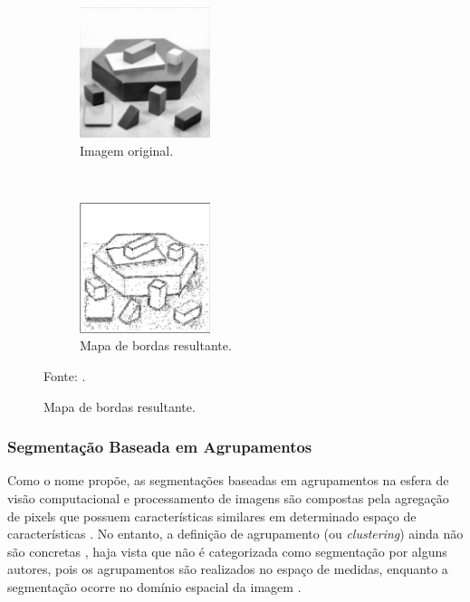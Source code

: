 \begin{figure}[H]
   \caption{Segmentação com operador Laplaciano.}
   \centering
   \label{segment:fig:8}
    \begin{subfigure}[t]{0.45\textwidth}
        \centering
        \includegraphics[height=1.5in]{recursos/imagens/image_seg/ol1.png}
        \caption{Imagem original.}
        \label{segment:fig:8.1}
    \end{subfigure}%
    ~ 
    \begin{subfigure}[t]{0.45\textwidth}
        \centering
        \includegraphics[height=1.5in]{recursos/imagens/image_seg/lp2.png}
        \caption{Mapa de bordas resultante.}
        \label{segment:fig:8.2}
    \end{subfigure}%

    \vspace*{1 cm}
    Fonte: \cite{pedrini2008analise}.
\end{figure}

\subsubsection{Segmentação Baseada em Agrupamentos}
\label{segment:group}

Como o nome propõe, as segmentações baseadas em agrupamentos na esfera de visão computacional e processamento de imagens são compostas pela agregação de pixels que possuem características similares em determinado espaço de características \cite{Yuheng2017}. No entanto, a definição de agrupamento (ou \textit{clustering}) ainda não são concretas \cite{Yuheng2017}, haja vista que não é categorizada como segmentação por alguns autores, pois os agrupamentos são realizados no espaço de medidas, enquanto a segmentação ocorre no domínio espacial da imagem \cite{Haralick1985}.


